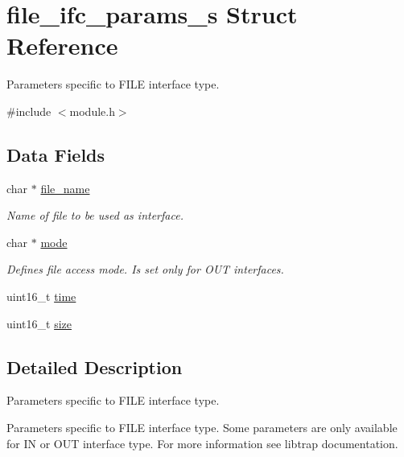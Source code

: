 \hypertarget{structfile__ifc__params__s}{}\section{file\+\_\+ifc\+\_\+params\+\_\+s Struct Reference}
\label{structfile__ifc__params__s}


Parameters specific to F\+I\+LE interface type.  




{\ttfamily \#include $<$module.\+h$>$}

\subsection*{Data Fields}
\begin{DoxyCompactItemize}
\item 
\mbox{\label{structfile__ifc__params__s_a2c9fd0f0b67448b4e456bf73d2cc777a}} 
char $\ast$ \hyperlink{structfile__ifc__params__s_a2c9fd0f0b67448b4e456bf73d2cc777a}{file\+\_\+name}
\begin{DoxyCompactList}\small\item\em Name of file to be used as interface. \end{DoxyCompactList}\item 
\mbox{\label{structfile__ifc__params__s_a5608783cc471ed5da802dc8c21caf0d4}} 
char $\ast$ \hyperlink{structfile__ifc__params__s_a5608783cc471ed5da802dc8c21caf0d4}{mode}
\begin{DoxyCompactList}\small\item\em Defines file access mode. Is set only for O\+UT interfaces. \end{DoxyCompactList}\item 
uint16\+\_\+t \hyperlink{structfile__ifc__params__s_af44673d76ef750daaa14d0b341105ff6}{time}
\item 
uint16\+\_\+t \hyperlink{structfile__ifc__params__s_a0d45dede0d17ebd5fae989c321408760}{size}
\end{DoxyCompactItemize}


\subsection{Detailed Description}
Parameters specific to F\+I\+LE interface type. 

Parameters specific to F\+I\+LE interface type. Some parameters are only available for IN or O\+UT interface type. For more information see libtrap documentation. 

